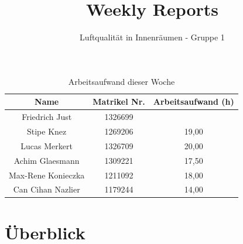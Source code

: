 \documentclass[]{article}
\title{Weekly Reports}
\author{Luftqualität in Innenräumen - Gruppe 1}
\begin{document}
\maketitle

\begin{table}[h!]
	\centering
	\begin{tabular}{|c|c|c|}
		\hline
		{\textbf{Name}}				&		{\textbf{Matrikel Nr.}} & {\textbf{Arbeitsaufwand (h)}} \\
		\hline
		Friedrich Just				&		1326699 				&		\\
		\hline
		Stipe Knez					&		1269206 				&	19,00	\\
		\hline
		Lucas Merkert				&		1326709					&	20,00	\\
		\hline
		Achim Glaesmann				&		1309221					&	17,50	\\
		\hline
		Max-Rene Konieczka			&		1211092					&	18,00	\\
		\hline
		Can Cihan Nazlier			&		1179244					&	14,00	\\
		\hline
	\end{tabular}
	\caption{Arbeitsaufwand dieser Woche}
	\label{tab:worakload}
\end{table}



\section{Überblick}
\end{document}

